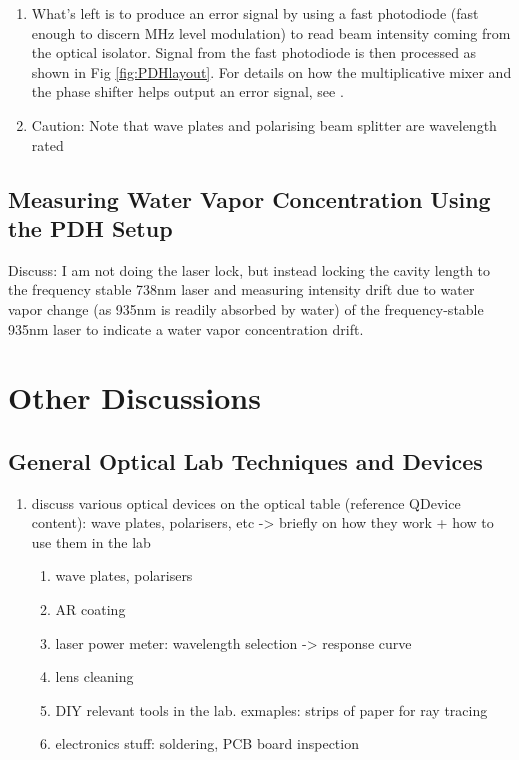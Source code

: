 \documentclass[12pt]{report}
\begin{document}
\begin{enumerate}
    \item What's left is to produce an error signal by using a fast photodiode (fast enough to discern MHz level modulation) to read beam intensity coming from the optical isolator. Signal from the fast photodiode is then processed as shown in Fig \ref{fig:PDHlayout}. For details on how the multiplicative mixer and the phase shifter helps output an error signal, see \cite{PDHintro}.

    \item Caution: Note that wave plates and polarising beam splitter are wavelength rated
\end{enumerate}


\section{Measuring Water Vapor Concentration Using the PDH Setup}
Discuss: I am not doing the laser lock, but instead locking the cavity length to the frequency stable 738nm laser and measuring intensity drift due to water vapor change (as 935nm is readily absorbed by water) of the frequency-stable 935nm laser to indicate a water vapor concentration drift. 

\chapter{Other Discussions}
\section{General Optical Lab Techniques and Devices}
\begin{enumerate}
    \item discuss various optical devices on the optical table (reference QDevice content): wave plates, polarisers, etc -> briefly on how they work + how to use them in the lab 
    \begin{enumerate}
        \item wave plates, polarisers
        \item AR coating
        \item laser power meter: wavelength selection -> response curve
        \item lens cleaning
        \item DIY relevant tools in the lab. exmaples: strips of paper for ray tracing
        \item electronics stuff: soldering, PCB board inspection
        
    \end{enumerate}
\end{enumerate}
\end{document}
